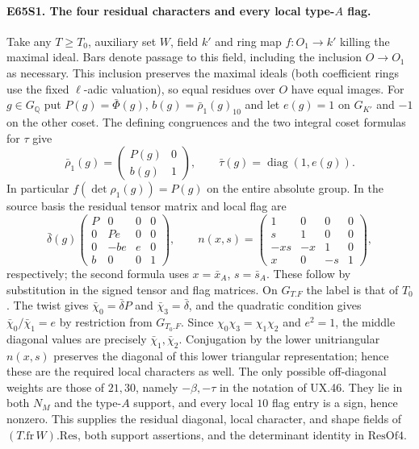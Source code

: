 \paragraph{E65S1. The four residual characters and every local type-$A$ flag.}
Take any $T\ge T_0$, auxiliary set $W$, field $k'$ and ring map
$f:O_1\to k'$ killing the maximal ideal. Bars denote passage to this
field, including the inclusion $O\to O_1$ as necessary. This inclusion
preserves the maximal ideals (both coefficient rings use the fixed
$\ell$-adic valuation), so equal residues over $O$ have equal images.
For $g\in G_{\mathbb Q}$ put $P(g)=\bar\Phi(g)$, $b(g)=\bar\rho_1(g)_{10}$
and let $e(g)=1$ on $G_{K'}$ and $-1$ on the other coset. The defining
congruences and the two integral coset formulas for $\tau$ give
\[
 \bar\rho_1(g)=\begin{pmatrix}P(g)&0\\ b(g)&1\end{pmatrix},
 \qquad \bar\tau(g)=\operatorname{diag}(1,e(g)).
\]
In particular $f(\det\rho_1(g))=P(g)$ on the entire absolute group.
In the source basis the residual tensor matrix and local flag are
\[
 \bar\delta(g)
 \begin{pmatrix}
 P&0&0&0\\0&Pe&0&0\\0&-be&e&0\\b&0&0&1
 \end{pmatrix},\qquad
 n(x,s)=\begin{pmatrix}
 1&0&0&0\\s&1&0&0\\-xs&-x&1&0\\x&0&-s&1
 \end{pmatrix},
\]
respectively; the second formula uses $x=\bar x_A$, $s=\bar s_A$.
These follow by substitution in the signed tensor and flag matrices.
On $G_{T.F}$ the label is that of $T_0$. The twist gives
$\bar\chi_0=\bar\delta P$ and $\bar\chi_3=\bar\delta$, and the
quadratic condition gives $\bar\chi_0/\bar\chi_1=e$ by restriction
from $G_{T_0.F}$. Since $\chi_0\chi_3=\chi_1\chi_2$ and $e^2=1$,
the middle diagonal values are precisely $\bar\chi_1,\bar\chi_2$.
Conjugation by the lower unitriangular $n(x,s)$ preserves the diagonal
of this lower triangular representation; hence these are the required
local characters as well. The only possible off-diagonal weights are
those of $21,30$, namely $-\beta,-\tau$ in the notation of UX.46.
They lie in both $N_M$ and the type-$A$ support, and every local $10$
flag entry is a sign, hence nonzero. This supplies the residual
diagonal, local character, and shape fields of $(T.\mathrm{fr}\,W).\mathrm{Res}$,
both support assertions, and the determinant identity in $\mathrm{ResOf4}$.

